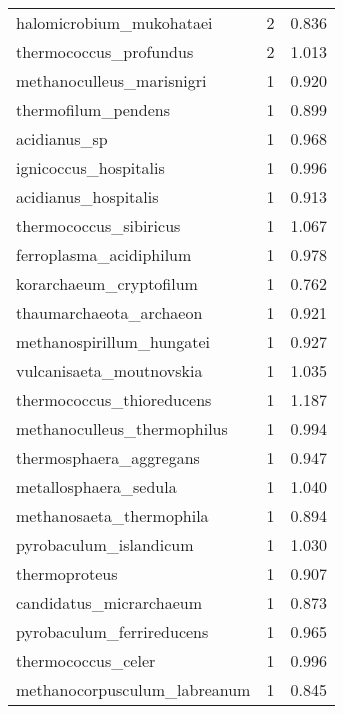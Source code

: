 \begin{tabular}{lrr}
               halomicrobium\_mukohataei &                   2 &     0.836 \\
                 thermococcus\_profundus &                   2 &     1.013 \\
              methanoculleus\_marisnigri &                   1 &     0.920 \\
                    thermofilum\_pendens &                   1 &     0.899 \\
                           acidianus\_sp &                   1 &     0.968 \\
                  ignicoccus\_hospitalis &                   1 &     0.996 \\
                   acidianus\_hospitalis &                   1 &     0.913 \\
                 thermococcus\_sibiricus &                   1 &     1.067 \\
                ferroplasma\_acidiphilum &                   1 &     0.978 \\
                korarchaeum\_cryptofilum &                   1 &     0.762 \\
                thaumarchaeota\_archaeon &                   1 &     0.921 \\
              methanospirillum\_hungatei &                   1 &     0.927 \\
               vulcanisaeta\_moutnovskia &                   1 &     1.035 \\
              thermococcus\_thioreducens &                   1 &     1.187 \\
            methanoculleus\_thermophilus &                   1 &     0.994 \\
                thermosphaera\_aggregans &                   1 &     0.947 \\
                  metallosphaera\_sedula &                   1 &     1.040 \\
               methanosaeta\_thermophila &                   1 &     0.894 \\
                 pyrobaculum\_islandicum &                   1 &     1.030 \\
                          thermoproteus &                   1 &     0.907 \\
                candidatus\_micrarchaeum &                   1 &     0.873 \\
              pyrobaculum\_ferrireducens &                   1 &     0.965 \\
                     thermococcus\_celer &                   1 &     0.996 \\
           methanocorpusculum\_labreanum &                   1 &     0.845 \\
\bottomrule
\end{tabular}
